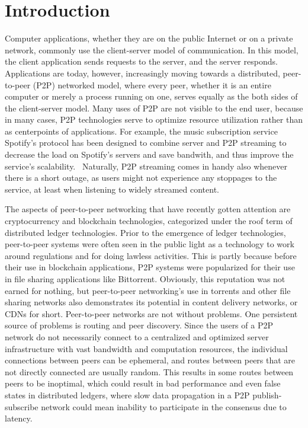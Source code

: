 \chapter{Introduction}
\label{Introduction}

Computer applications, whether they are on the public Internet or on a private network, commonly use the client-server model of communication. In this model, the client application sends requests to the server, and the server responds. Applications are today, however, increasingly moving towards a distributed, peer-to-peer (P2P) networked model, where every peer, whether it is an entire computer or merely a process running on one, serves equally as the both sides of the client-server model. Many uses of P2P are not visible to the end user, because in many cases, P2P technologies serve to optimize resource utilization rather than as centerpoints of applications. For example, the music subscription service Spotify's protocol has been designed to combine server and P2P streaming to decrease the load on Spotify's servers and save bandwith, and thus improve the service's scalability.~\cite{Kreitz_undated-yp} Naturally, P2P streaming comes in handy also whenever there is a short outage, as users might not experience any stoppages to the service, at least when listening to widely streamed content. 

The aspects of peer-to-peer networking that have recently gotten attention are cryptocurrency and blockchain technologies, categorized under the roof term of distributed ledger technologies. Prior to the emergence of ledger technologies, peer-to-peer systems were often seen in the public light as a technology to work around regulations and for doing lawless activities. This is partly because before their use in blockchain applications, P2P systems were popularized for their use in file sharing applications like Bittorrent. Obviously, this reputation was not earned for nothing, but peer-to-peer networking's use in torrents and other file sharing networks also demonstrates its potential in content delivery networks, or CDNs for short. Peer-to-peer networks are not without problems. One persistent source of problems is routing and peer discovery. Since the users of a P2P network do not necessarily connect to a centralized and optimized server infrastructure with vast bandwidth and computation resources, the individual connections between peers can be ephemeral, and routes between peers that are not directly connected are usually random. This results in some routes between peers to be inoptimal, which could result in bad performance and even false states in distributed ledgers, where slow data propagation in a P2P publish-subscribe network could mean inability to participate in the consensus due to latency.

